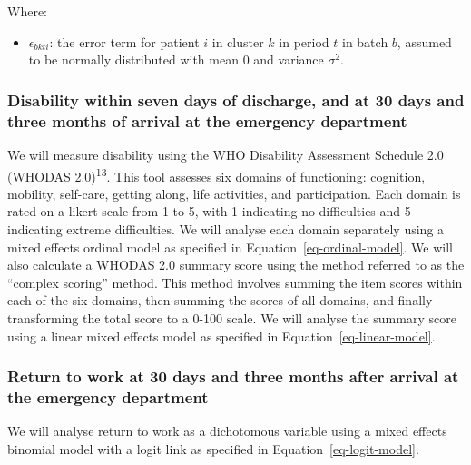 \documentclass[
]{scrartcl}
\providecommand{\tightlist}{%
  \setlength{\itemsep}{0pt}\setlength{\parskip}{0pt}}\usepackage{longtable,booktabs,array}
\begin{document}
Where:

\begin{itemize}
\tightlist
\item
  \(\epsilon_{bkti}\): the error term for patient \(i\) in cluster \(k\)
  in period \(t\) in batch \(b\), assumed to be normally distributed
  with mean 0 and variance \(\sigma^2\).
\end{itemize}

\hypertarget{disability-within-seven-days-of-discharge-and-at-30-days-and-three-months-of-arrival-at-the-emergency-department}{%
\subsubsection{Disability within seven days of discharge, and at 30 days
and three months of arrival at the emergency
department}\label{disability-within-seven-days-of-discharge-and-at-30-days-and-three-months-of-arrival-at-the-emergency-department}}

We will measure disability using the WHO Disability Assessment Schedule
2.0 (WHODAS 2.0)\textsuperscript{13}. This tool assesses six domains of
functioning: cognition, mobility, self-care, getting along, life
activities, and participation. Each domain is rated on a likert scale
from 1 to 5, with 1 indicating no difficulties and 5 indicating extreme
difficulties. We will analyse each domain separately using a mixed
effects ordinal model as specified in Equation~\ref{eq-ordinal-model}.
We will also calculate a WHODAS 2.0 summary score using the method
referred to as the ``complex scoring'' method. This method involves
summing the item scores within each of the six domains, then summing the
scores of all domains, and finally transforming the total score to a
0-100 scale. We will analyse the summary score using a linear mixed
effects model as specified in Equation~\ref{eq-linear-model}.

\hypertarget{return-to-work-at-30-days-and-three-months-after-arrival-at-the-emergency-department}{%
\subsubsection{Return to work at 30 days and three months after arrival
at the emergency
department}\label{return-to-work-at-30-days-and-three-months-after-arrival-at-the-emergency-department}}

We will analyse return to work as a dichotomous variable using a mixed
effects binomial model with a logit link as specified in
Equation~\ref{eq-logit-model}.
\end{document}
